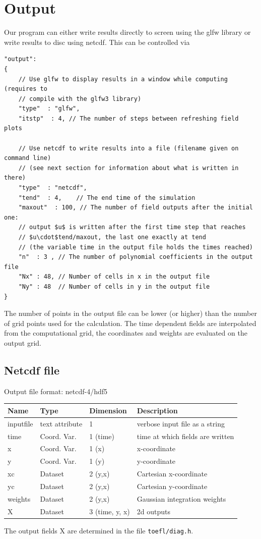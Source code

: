 \section{Output} \label{sec:output}
Our program can either write results directly to screen using the glfw library
or write results to disc using netcdf.
This can be controlled via
\begin{verbatim}
"output":
{
    // Use glfw to display results in a window while computing (requires to
    // compile with the glfw3 library)
    "type"  : "glfw",
    "itstp"  : 4, // The number of steps between refreshing field plots

    // Use netcdf to write results into a file (filename given on command line)
    // (see next section for information about what is written in there)
    "type"  : "netcdf",
    "tend"  : 4,    // The end time of the simulation
    "maxout"  : 100, // The number of field outputs after the initial one:
    // output $u$ is written after the first time step that reaches
    // $u\cdot$tend/maxout, the last one exactly at tend
    // (the variable time in the output file holds the times reached)
    "n"  : 3 , // The number of polynomial coefficients in the output file
    "Nx" : 48, // Number of cells in x in the output file
    "Ny" : 48  // Number of cells in y in the output file
}
\end{verbatim}
The number of points in the output file can be lower (or higher) than the number of
grid points used for the calculation. The time dependent fields are
interpolated from the computational grid, the coordinates and weights are
evaluated on the output grid.
\subsection{Netcdf file}
Output file format: netcdf-4/hdf5

\begin{longtable}{lll>{\RaggedRight}p{7cm}}
\toprule
\rowcolor{gray!50}\textbf{Name} &  \textbf{Type} & \textbf{Dimension} & \textbf{Description}  \\ \midrule
inputfile        & text attribute & 1 & verbose input file as a string \\
time             & Coord. Var. & 1 (time) & time at which fields are written \\
x                & Coord. Var. & 1 (x) & x-coordinate  \\
y                & Coord. Var. & 1 (y) & y-coordinate \\
xc               & Dataset & 2 (y,x) & Cartesian x-coordinate  \\
yc               & Dataset & 2 (y,x) & Cartesian y-coordinate \\
weights          & Dataset & 2 (y,x) & Gaussian integration weights \\
X                & Dataset & 3 (time, y, x) & 2d outputs \\
\bottomrule
\end{longtable}
The output fields X are determined in the file \texttt{toefl/diag.h}.

